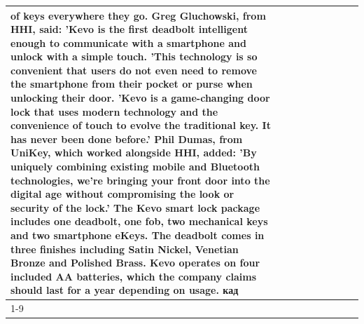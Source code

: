 \begin{table}[H]
\begin{tabular}{lllrlllll}
of keys everywhere they go. Greg Gluchowski, from HHI, said: 'Kevo is the first deadbolt intelligent enough to communicate with a smartphone and unlock with a simple touch. 'This technology is so convenient that users do not even need to remove the smartphone from their pocket or purse when unlocking their door. 'Kevo is a game-changing door lock that uses modern technology and the convenience of touch to evolve the traditional key. It has never been done before.' Phil Dumas, from UniKey, which worked alongside HHI, added: 'By uniquely combining existing mobile and Bluetooth technologies, we’re bringing your front door into the digital age without compromising the look or security of the lock.' The Kevo smart lock package includes one deadbolt, one fob, two mechanical keys and two smartphone eKeys. The deadbolt comes in three finishes including Satin Nickel, Venetian Bronze and Polished Brass. Kevo operates on four included AA batteries, which the company claims should last for a year depending on usage. кад \\
\cline{1-9}

\end{tabular}
\end{table}
